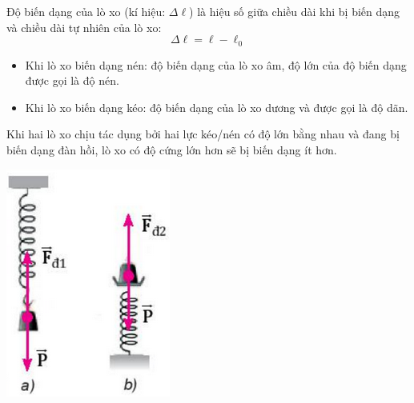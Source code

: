 \begin{minipage}{0.6\textwidth}
	Độ biến dạng của lò xo (kí hiệu: $\Delta \ell$) là hiệu số giữa chiều dài khi bị biến dạng và chiều dài tự nhiên của lò xo:
	$$\Delta \ell=\ell-\ell_0$$
	\begin{itemize}
		\item Khi lò xo biến dạng nén: độ biến dạng của lò xo âm, độ lớn của độ biến dạng được gọi là độ nén.
		\item Khi lò xo biến dạng kéo: độ biến dạng của lò xo dương và được gọi là độ dãn.
	\end{itemize}
	
	
	Khi hai lò xo chịu tác dụng bởi hai lực kéo/nén có độ lớn bằng nhau và đang bị biến dạng đàn hồi, lò xo có độ cứng lớn hơn sẽ bị biến dạng ít hơn.
\end{minipage}
\begin{minipage}{0.4\textwidth}
	\begin{center}
		\includegraphics[scale=0.8]{../figs/G10-028-2}
	\end{center}
\end{minipage}

